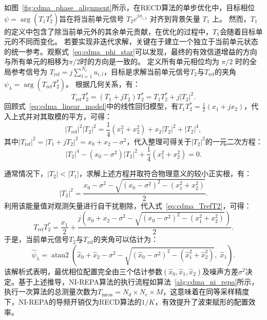 如图~\ref{fig:cdma_phase_alignment}所示，在RECD算法的单步优化中，目标相位$\psi = \arg(T_1 T_2^*)$旨在将当前单元信号 $T_2 e^{j\phi_{i,\lambda}}$ 对齐到背景矢量 $T_1$ 上。
然而，$T_1$ 的定义中包含了除当前单元外的其余单元贡献，在优化的过程中，$T_1$会随着目标单元的不同而变化。
若要实现非迭代求解，关键在于建立一个独立于当前单元状态的统一参考。观察式~\eqref{eq:cdma_phi_star}可以发现，最终的有效信道增益的方向与所有单元的相移为$\pi/2$时的方向是一致的。
定义所有单元相位均为 $\pi/2$ 时的全局参考信号为 $T_{\text{ref}} = j \sum_{l=1}^{N_e} u_{i,l}$，目标是求解当前单元信号$T_2$与$T_{\text{ref}}$的夹角$\psi_\lambda=\arg(T_{\text{ref}}T_2^*)$。
根据几何关系，有：
\begin{equation}\label{eq:cdma_TrefT2}
	T_{\text{ref}}T_2^* = (T_1+jT_2)T_2^*=T_1 T_2^* + j|T_2|^2.
\end{equation}
回顾式~\eqref{eq:cdma_linear_model}中的线性回归模型，有$T_1 T_2^*=\frac{1}{2}(x_1 + j x_2)$，代入上式并对其取模的平方，可得：
\begin{equation}
	|T_{\text{ref}}|^2|T_2|^2 =\frac{1}{4}(x_1^2+x_2^2)+x_2|T_2|^2+|T_2|^4,
\end{equation}
其中$|T_{\text{ref}}|^2 = |T_1+jT_2|^2=x_0+x_2-\sigma^2$，代入整理可得关于$|T_2|^2$的一元二次方程：
\begin{equation}
	|T_2|^4-(x_0-\sigma^2)|T_2|^2+\frac{1}{4}(x_1^2+x_2^2)=0.
\end{equation}

通常情况下，$|T_2|<|T_1|$，求解上述方程并取符合物理意义的较小正实根，有：
\begin{equation}
	|T_2|^2=\frac{x_0-\sigma^2-\sqrt{(x_0-\sigma^2)^2 - (x_1^2 + x_2^2)}}{2}.
\end{equation}
利用该能量值对观测矢量进行自干扰剔除，代入式~\eqref{eq:cdma_TrefT2}，可得：
\begin{equation}
	T_{\text{ref}}T_2^* =\frac{x_1}{2}+
	\frac{j\left( x_0+x_2-\sigma^2-\sqrt{(x_0-\sigma^2)^2 - (x_1^2 + x_2^2)}\right) }{2}.
\end{equation}
于是，当前单元信号$T_2$与$T_{\text{ref}}$的夹角可以估计为：
\begin{equation}\label{eq:cdma_hat_psi_lambda}
	\hat{\psi}_\lambda = \operatorname{atan2}\left(\hat x_0 +\hat x_2 - \sigma^2 - \sqrt{(\hat x_0 - \sigma^2)^2 - ( \hat x_1^2 +\hat x_2^2)},\; \hat x_1 \right).
\end{equation}
该解析式表明，最优相位配置完全由三个估计参数$(\hat x_0, \hat x_1, \hat x_2)$及噪声方差$\sigma^2$决定。基于上述推导，NI-REPA算法的执行流程如算法~\ref{alg:cdma_ni_repa}所示，执行一次算法的总测量次数为$T_{\text{meas}} = N_d \times N_e \times M$，这意味着在同等采样精度下，NI-REPA的导频开销仅为RECD算法的$1/K$，有效提升了波束赋形的配置效率。

